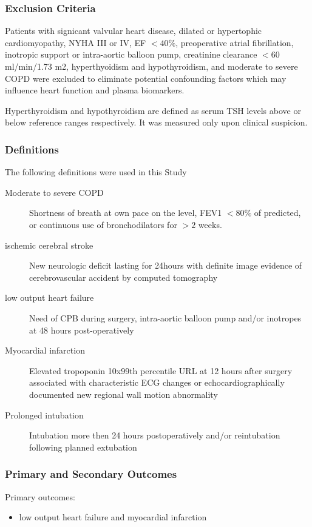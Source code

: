 \documentclass[14pt,a4paper,onecolumn]{extarticle}
\begin{document}
\subsubsection{Exclusion Criteria}

Patients with signicant valvular heart disease, dilated or hypertophic cardiomyopathy, NYHA III or IV, EF $< 40\%$, preoperative atrial fibrillation, inotropic support or intra-aortic balloon pump, creatinine clearance $< 60$ ml/min/1.73 m2, hyperthyoidism and hypothyroidism, and moderate to severe COPD were excluded to eliminate potential confounding factors which may influence heart function and plasma biomarkers.

Hyperthyroidism and hypothyroidism are defined as serum TSH levels above or below reference ranges respectively.  It was measured only upon clinical suspicion.

\subsubsection{Definitions}
The following definitions were used in this Study
    \begin{description}
        \item [Moderate to severe COPD]
        Shortness of breath at own pace on the level, FEV1 $< 80\%$ of predicted, or continuous use of bronchodilators for $> 2$ weeks.
        \item [ischemic cerebral stroke]
        New neurologic deficit lasting for  24hours with definite image evidence of cerebrovascular accident by computed tomography
        \item [low output heart failure]
        Need of CPB during surgery, intra-aortic balloon pump and/or inotropes at 48 hours post-operatively
        \item [Myocardial infarction]
        Elevated tropoponin 10x99th percentile URL at 12 hours after surgery associated with characteristic ECG changes or echocardiographically documented new regional wall motion abnormality
        \item [Prolonged intubation]
        Intubation more then 24 hours postoperatively and/or reintubation following planned extubation
    \end{description}

\subsubsection{Primary and Secondary Outcomes}
Primary outcomes:
    \begin{itemize}
        \item low output heart failure and myocardial infarction
    \end{itemize}
\end{document}
